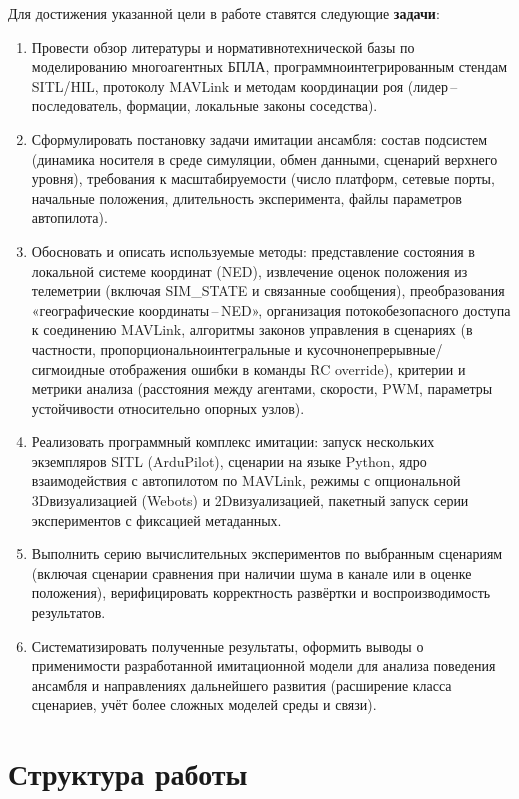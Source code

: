 \documentclass[12pt,a4paper]{article}
\begin{document}
Для достижения указанной цели в работе ставятся следующие \textbf{задачи}:
\begin{enumerate}
  \item Провести обзор литературы и нормативно\-технической базы по
    моделированию многоагентных БПЛА, программно\-интегрированным
    стендам SITL/HIL, протоколу MAVLink и методам координации роя
    (лидер\,--\,последователь, формации, локальные законы соседства).
  \item Сформулировать постановку задачи имитации ансамбля: состав
    подсистем (динамика носителя в среде симуляции, обмен данными,
    сценарий верхнего уровня), требования к масштабируемости
    (число платформ, сетевые порты, начальные положения, длительность
    эксперимента, файлы параметров автопилота).
  \item Обосновать и описать используемые методы: представление
    состояния в локальной системе координат (NED), извлечение
    оценок положения из телеметрии (включая SIM\_STATE и связанные
    сообщения), преобразования «географические координаты\,--\,NED»,
    организация потокобезопасного доступа к соединению MAVLink,
    алгоритмы законов управления в сценариях (в частности,
    пропорционально\-интегральные и кусочно\-непрерывные/сигмоидные
    отображения ошибки в команды RC override), критерии и метрики
    анализа (расстояния между агентами, скорости, PWM, параметры
    устойчивости относительно опорных узлов).
  \item Реализовать программный комплекс имитации: запуск нескольких
    экземпляров SITL (ArduPilot), сценарии на языке Python,
    ядро взаимодействия с автопилотом по MAVLink, режимы с
    опциональной 3D\-визуализацией (Webots) и 2D\-визуализацией,
    пакетный запуск серии экспериментов с фиксацией метаданных.
  \item Выполнить серию вычислительных экспериментов по выбранным
    сценариям (включая сценарии сравнения при наличии шума в канале
    или в оценке положения), верифицировать корректность развёртки
    и воспроизводимость результатов.
  \item Систематизировать полученные результаты, оформить выводы
    о применимости разработанной имитационной модели для анализа
    поведения ансамбля и направлениях дальнейшего развития
    (расширение класса сценариев, учёт более сложных моделей среды
    и связи).
\end{enumerate}

\section*{Структура работы}
\end{document}
